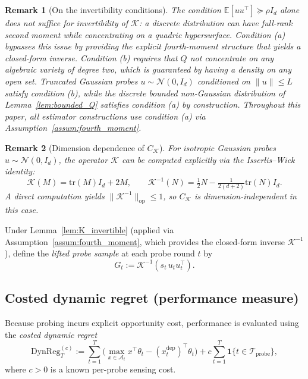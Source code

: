 \documentclass[12pt]{article}
\newcommand{\E}{\mathbb{E}}
\newcommand{\op}{\mathrm{op}}
\newcommand{\cA}{\mathcal{A}}
\newcommand{\cTprobe}{\mathcal{T}_{\mathrm{probe}}}
\newcommand{\DynReg}{\mathrm{DynReg}}
\newcommand{\tr}{\mathrm{tr}}
\newtheorem{remark}{Remark}
\theoremstyle{plain}
\theoremstyle{definition}
\begin{document}
\begin{remark}[On the invertibility conditions]
\label{rem:K_invertible_conditions}
The condition $\E[uu^\top] \succeq \rho I_d$ alone does not suffice for invertibility of $\mathcal{K}$: a discrete distribution can have full-rank second moment while concentrating on a quadric hypersurface. Condition (a) bypasses this issue by providing the explicit fourth-moment structure that yields a closed-form inverse. Condition (b) requires that $Q$ not concentrate on any algebraic variety of degree two, which is guaranteed by having a density on any open set. Truncated Gaussian probes $u \sim \mathcal{N}(0, I_d)$ conditioned on $\|u\| \le L$ satisfy condition (b), while the discrete bounded non-Gaussian distribution of Lemma~\ref{lem:bounded_Q} satisfies condition (a) by construction. Throughout this paper, all estimator constructions use condition (a) via Assumption~\ref{assum:fourth_moment}.
\end{remark}

\begin{remark}[Dimension dependence of $C_{\mathcal{K}}$]
\label{rem:CK_dimension}
For isotropic Gaussian probes $u \sim \mathcal{N}(0, I_d)$, the operator $\mathcal{K}$ can be computed explicitly via the Isserlis--Wick identity:
\[
\mathcal{K}(M) = \tr(M) I_d + 2M,
\qquad
\mathcal{K}^{-1}(N) = \tfrac{1}{2}N - \tfrac{1}{2(d+2)}\tr(N) I_d.
\]
A direct computation yields $\|\mathcal{K}^{-1}\|_{\op} \le 1$, so $C_{\mathcal{K}}$ is dimension-independent in this case.
\end{remark}

Under Lemma~\ref{lem:K_invertible} (applied via Assumption~\ref{assum:fourth_moment}, which provides the closed-form inverse $\mathcal{K}^{-1}$), define the \emph{lifted probe sample} at each probe round $t$ by
\begin{equation}
G_t := \mathcal{K}^{-1}(s_t\, u_t u_t^\top).
\label{eq:lifted_probe}
\end{equation}

\subsection{Costed dynamic regret (performance measure)}

Because probing incurs explicit opportunity cost, performance is evaluated using the \emph{costed dynamic regret}
\begin{equation}
\DynReg_T^{(c)}
:=
\sum_{t=1}^T \Big( \max_{x \in \cA_t} x^\top \theta_t - (x_t^{\mathrm{dep}})^\top \theta_t \Big)
+ c \sum_{t=1}^T \mathbf{1}\{t \in \cTprobe\},
\label{eq:costed_regret}
\end{equation}
where $c > 0$ is a known per-probe sensing cost.
\end{document}
